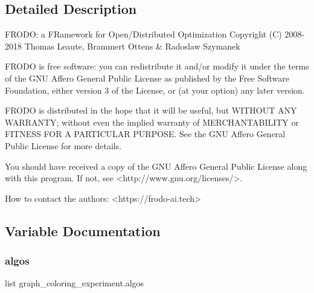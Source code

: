 \subsection{Detailed Description}
\begin{DoxyVerb}FRODO: a FRamework for Open/Distributed Optimization
Copyright (C) 2008-2018  Thomas Leaute, Brammert Ottens & Radoslaw Szymanek

FRODO is free software: you can redistribute it and/or modify
it under the terms of the GNU Affero General Public License as published by
the Free Software Foundation, either version 3 of the License, or
(at your option) any later version.

FRODO is distributed in the hope that it will be useful,
but WITHOUT ANY WARRANTY; without even the implied warranty of
MERCHANTABILITY or FITNESS FOR A PARTICULAR PURPOSE.  See the
GNU Affero General Public License for more details.

You should have received a copy of the GNU Affero General Public License
along with this program.  If not, see <http://www.gnu.org/licenses/>.


How to contact the authors: 
<https://frodo-ai.tech>
\end{DoxyVerb}
 

\subsection{Variable Documentation}
\mbox{\label{namespacegraph__coloring__experiment_a4327af884d507aa7e22e2173532cad85}} 
\subsubsection{\texorpdfstring{algos}{algos}}
{\footnotesize\ttfamily list graph\+\_\+coloring\+\_\+experiment.\+algos}

